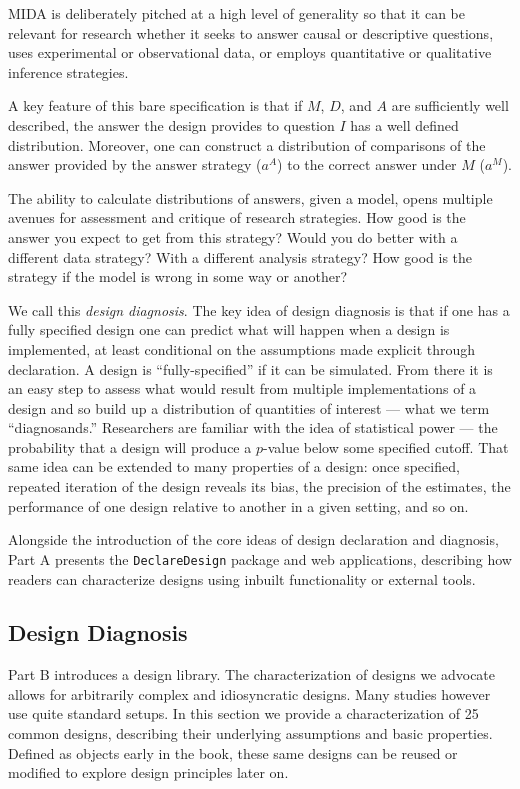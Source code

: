 \documentclass[11pt]{article}
\begin{document}
MIDA is deliberately pitched at a high level of generality so that it can be relevant for research whether it seeks to answer causal or descriptive questions, uses experimental or observational data, or employs quantitative or qualitative inference strategies.

A key feature of this bare specification is that if $M$, $D$, and $A$ are sufficiently well described, the answer the design provides to question $I$ has a well defined distribution. Moreover, one can construct a distribution of comparisons of the answer provided by the answer strategy ($a^A$) to the correct answer under $M$ ($a^M$). 

The ability to calculate distributions of answers, given a model, opens multiple avenues for assessment and critique of research strategies. How good is the answer you expect to get from this strategy? Would you do better with a different data strategy? With a different analysis strategy? How good is the strategy if the model is wrong in some way or another? 

We call this \textit{design diagnosis}. The key idea of design diagnosis is that if one has a fully specified design one can predict what will happen when a design is implemented, at least conditional on the assumptions made explicit through declaration. A design is ``fully-specified'' if it can be simulated. From there it is an easy step to assess what would result from multiple implementations of a design and so build up a distribution of quantities of interest --- what we term ``diagnosands.'' Researchers are familiar with the idea of statistical power --- the probability that a design will produce a $p$-value below some specified cutoff. That same idea can be extended to many properties of a design: once specified, repeated iteration of the design reveals its bias, the precision of the estimates, the performance of one design relative to another in a given setting, and so on. 

Alongside the introduction of the core ideas of design declaration and diagnosis, Part A presents the \texttt{DeclareDesign} package and web applications, describing how readers can characterize designs using inbuilt functionality or external tools.


\subsection{Design Diagnosis}

Part B introduces a design library. The characterization of designs we advocate allows for arbitrarily complex and idiosyncratic designs. Many studies however use quite standard setups. In this section we provide a characterization of 25 common designs, describing their underlying assumptions and basic properties. Defined as objects early in the book, these same designs can be reused or modified to explore design principles later on. 
\end{document}
